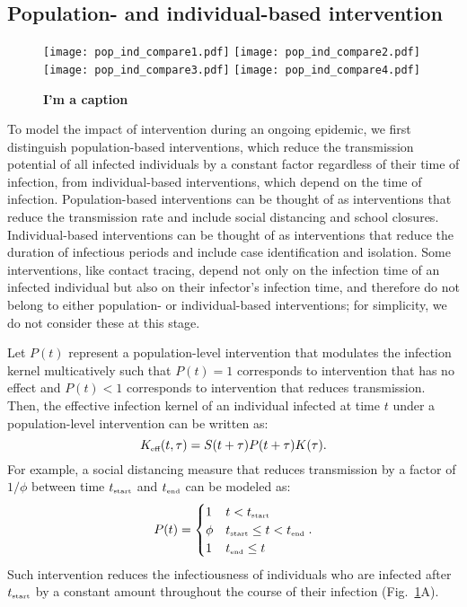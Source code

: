 \documentclass[12pt]{article}
\newcommand{\fref}[1]{Fig.~\ref{fig:#1}}
\newcommand{\tsub}[2]{#1_{{\textrm{\tiny #2}}}}
\newcommand{\tstart}{\ensuremath{\tsub{t}{start}}\xspace}
\newcommand{\tend}{\ensuremath{\tsub{t}{end}}\xspace}
\newcommand{\Keff}{\ensuremath{\tsub{K}{eff}}\xspace}
\begin{document}
\subsection{Population- and individual-based intervention}

\begin{figure}[!th]
\texttt{[image: pop\_ind\_compare1.pdf]}
\mbox{\hspace{0.01\textwidth}}
\texttt{[image: pop\_ind\_compare2.pdf]}
\\
\texttt{[image: pop\_ind\_compare3.pdf]}
\mbox{\hspace{0.01\textwidth}}
\texttt{[image: pop\_ind\_compare4.pdf]}
\caption{
\textbf{I'm a caption}
}
\label{fig:indpop}
\end{figure}

To model the impact of intervention during an ongoing epidemic, we first distinguish population-based interventions, which reduce the transmission potential of all infected individuals by a constant factor regardless of their time of infection, from individual-based interventions, which depend on the time of infection.
Population-based interventions can be thought of as interventions that reduce the transmission rate and include social distancing and school closures.
Individual-based interventions can be thought of as interventions that reduce the duration of infectious periods and include case identification and isolation.
Some interventions, like contact tracing, depend not only on the infection time of an infected individual but also on their infector's infection time, and therefore do not belong to either population- or individual-based interventions;
for simplicity, we do not consider these at this stage.

Let $P(t)$ represent a population-level intervention that modulates the infection kernel multicatively such that $P(t)=1$ corresponds to intervention that has no effect and $P(t) < 1$ corresponds to intervention that reduces transmission.
Then, the effective infection kernel of an individual infected at time $t$ under a population-level intervention can be written as:
\begin{equation}
\Keff(t, \tau) = S(t+\tau) P(t + \tau) K(\tau).
\end{equation}
For example, a social distancing measure that reduces transmission by a factor of $1/\phi$ between time \tstart and \tend can be modeled as:
\begin{equation}
P(t) = \begin{cases}
1 & t < \tstart\\
\phi & \tstart \leq t < \tend\\
1 & \tend \leq t
\end{cases}.
\end{equation}
Such intervention reduces the infectiousness of individuals who are infected after \tstart by a constant amount throughout the course of their infection (\fref{indpop}A).
\end{document}
